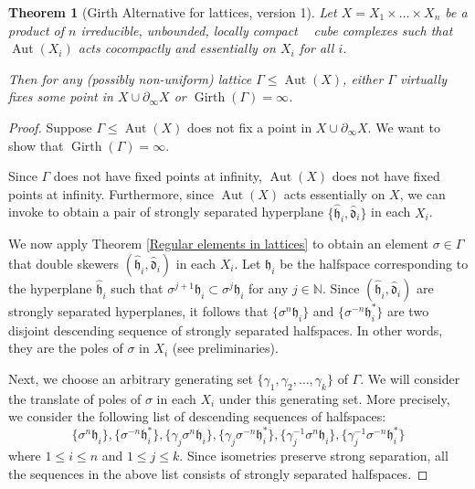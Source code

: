 \documentclass{amsart}
\newtheorem{theorem}{Theorem}%
\theoremstyle{definition}
\newtheorem*{Notation warning}{Warning on notations}
\newtheorem*{Sketch of proof}{Sketch of proof for Theorem C}
\newcommand{\gs}{\sigma }
\newcommand{\bdry}{\partial_\infty}
\newcommand{\h}{{\mathfrak h}}
\newcommand{\hh}{\hat{\mathfrak h}}
\newcommand{\hk}{\hat{\mathfrak d}}
\DeclareMathOperator{\cat}{CAT(0)}
\DeclareMathOperator{\Gir}{Girth}
\def\aut{\mathop{\mathrm{Aut}}\nolimits}
\begin{document}
\begin{sloppypar}
\begin{theorem}[Girth Alternative for lattices, version 1]\label{premain theorem}
     Let $X = X_1 \times \dots \times X_n$ be a product of $n$ irreducible, unbounded, locally compact $\cat$ cube complexes such that $\aut(X_i)$ acts cocompactly and essentially on $X_i$ for all $i$. 
\medskip

Then for any (possibly non-uniform) lattice $\Gamma \leq \aut(X)$, 
either $\Gamma$ virtually fixes some point in $X\cup \bdry X$ or 
$\Gir(\Gamma)=\infty$.
\end{theorem}

\begin{proof}
    Suppose $\Gamma\le\aut(X)$ does not fix a point in $X\cup\bdry X$. We want to show that $\Gir(\Gamma)=\infty$.
    \medskip
    
    Since $\Gamma$ does not have fixed points at infinity, $\aut(X)$ does not have fixed points at infinity. Furthermore, since $\aut(X)$ acts essentially on $X$, we can invoke \cite[Proposition 5.1]{Caprace_2011} to obtain a pair of strongly separated hyperplane $\{\hh_i,\hk_i\}$ in each $X_i$.
    \medskip

    We now apply Theorem \ref{Regular elements in lattices} to obtain an element $\gs\in \Gamma$ that double skewers $(\hh_i,\hk_i)$ in each $X_i$.  
    Let $\h_i$ be the halfspace corresponding to the hyperplane $\hh_i$ such that $\gs^{j+1}\h_i\subset \gs^j\h_i$ for any $j\in \mathbb{N}$.
    Since $(\hh_i,\hk_i)$ are strongly separated hyperplanes,
    it follows that $\{\gs^n\h_i\}$ and $\{\gs^{-n}\h^*_i\}$ are two disjoint descending sequence of strongly separated halfspaces.
    In other words, they are the poles of $\gs$ in $X_i$ (see preliminaries).
    \medskip
    
    
    Next, we choose an arbitrary generating set $\{\gamma_1,\gamma_2,\ldots, \gamma_k\}$ of $\Gamma$.
   We will consider the translate of poles of $\gs$ in each $X_i$ under this generating set.
   More precisely, we consider the following list of descending sequences of  halfspaces:
        \begin{equation*}\label{list of poles}
        \{\gs^n\h_i\}, \{\gs^{-n}\h_i^*\}, \{\gamma_j\gs^n\h_i\}, \{\gamma_j\gs^{-n}\h^*_i\}, \{\gamma_j^{-1}\gs^n\h_i\}, \{\gamma_j^{-1}\gs^{-n}\h_i^*\} \tag{$\dagger$}
        \end{equation*}
        where $1\leq i\leq n$ and $1\leq j\leq k$.
Since isometries preserve strong separation, all the sequences in the above list consists of strongly separated halfspaces.
        

\end{proof}
\end{sloppypar}
\end{document}

